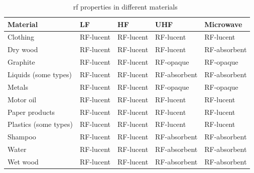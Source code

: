 \begin{table}[!htb]
    \centering
    \caption{\ac{rf} properties in different materials~\cite{lahiriRFIDSourcebook2005}}
    \begin{tabular}{|l|l|l|l|l|}
    \hline
    \textbf{Material}     & \textbf{LF} & \textbf{HF} & \textbf{UHF} & \textbf{Microwave} \\ \hline
    Clothing              & RF-lucent   & RF-lucent   & RF-lucent    & RF-lucent          \\ \hline
    Dry wood              & RF-lucent   & RF-lucent   & RF-lucent    & RF-absorbent       \\ \hline
    Graphite              & RF-lucent   & RF-lucent   & RF-opaque    & RF-opaque          \\ \hline
    Liquids (some types)  & RF-lucent   & RF-lucent   & RF-absorbent & RF-absorbent       \\ \hline
    Metals                & RF-lucent   & RF-lucent   & RF-opaque    & RF-opaque          \\ \hline
    Motor oil             & RF-lucent   & RF-lucent   & RF-lucent    & RF-lucent          \\ \hline
    Paper products        & RF-lucent   & RF-lucent   & RF-lucent    & RF-lucent          \\ \hline
    Plastics (some types) & RF-lucent   & RF-lucent   & RF-lucent    & RF-lucent          \\ \hline
    Shampoo               & RF-lucent   & RF-lucent   & RF-absorbent & RF-absorbent       \\ \hline
    Water                 & RF-lucent   & RF-lucent   & RF-absorbent & RF-absorbent       \\ \hline
    Wet wood              & RF-lucent   & RF-lucent   & RF-absorbent & RF-absorbent       \\ \hline
    \end{tabular}
    \label{tab:rfproperties}
\end{table}

